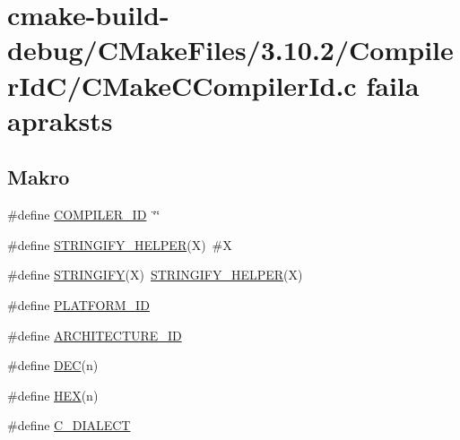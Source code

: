 \hypertarget{cmake-build-debug_2_c_make_files_23_810_82_2_compiler_id_c_2_c_make_c_compiler_id_8c}{}\section{cmake-\/build-\/debug/\+C\+Make\+Files/3.10.2/\+Compiler\+Id\+C/\+C\+Make\+C\+Compiler\+Id.c faila apraksts}
\label{cmake-build-debug_2_c_make_files_23_810_82_2_compiler_id_c_2_c_make_c_compiler_id_8c}
\subsection*{Makro}
\begin{DoxyCompactItemize}
\item 
\#define \hyperlink{cmake-build-debug_2_c_make_files_23_810_82_2_compiler_id_c_2_c_make_c_compiler_id_8c_a81dee0709ded976b2e0319239f72d174}{C\+O\+M\+P\+I\+L\+E\+R\+\_\+\+ID}~\char`\"{}\char`\"{}
\item 
\#define \hyperlink{cmake-build-debug_2_c_make_files_23_810_82_2_compiler_id_c_2_c_make_c_compiler_id_8c_a2ae9b72bb13abaabfcf2ee0ba7d3fa1d}{S\+T\+R\+I\+N\+G\+I\+F\+Y\+\_\+\+H\+E\+L\+P\+ER}(X)~\#X
\item 
\#define \hyperlink{cmake-build-debug_2_c_make_files_23_810_82_2_compiler_id_c_2_c_make_c_compiler_id_8c_a43e1cad902b6477bec893cb6430bd6c8}{S\+T\+R\+I\+N\+G\+I\+FY}(X)~\hyperlink{cmake-build-release_2_c_make_files_23_810_82_2_compiler_id_c_x_x_2_c_make_c_x_x_compiler_id_8cpp_a2ae9b72bb13abaabfcf2ee0ba7d3fa1d}{S\+T\+R\+I\+N\+G\+I\+F\+Y\+\_\+\+H\+E\+L\+P\+ER}(X)
\item 
\#define \hyperlink{cmake-build-debug_2_c_make_files_23_810_82_2_compiler_id_c_2_c_make_c_compiler_id_8c_adbc5372f40838899018fadbc89bd588b}{P\+L\+A\+T\+F\+O\+R\+M\+\_\+\+ID}
\item 
\#define \hyperlink{cmake-build-debug_2_c_make_files_23_810_82_2_compiler_id_c_2_c_make_c_compiler_id_8c_aba35d0d200deaeb06aee95ca297acb28}{A\+R\+C\+H\+I\+T\+E\+C\+T\+U\+R\+E\+\_\+\+ID}
\item 
\#define \hyperlink{cmake-build-debug_2_c_make_files_23_810_82_2_compiler_id_c_2_c_make_c_compiler_id_8c_ad1280362da42492bbc11aa78cbf776ad}{D\+EC}(n)
\item 
\#define \hyperlink{cmake-build-debug_2_c_make_files_23_810_82_2_compiler_id_c_2_c_make_c_compiler_id_8c_a46d5d95daa1bef867bd0179594310ed5}{H\+EX}(n)
\item 
\#define \hyperlink{cmake-build-debug_2_c_make_files_23_810_82_2_compiler_id_c_2_c_make_c_compiler_id_8c_a07f8e5783674099cd7f5110e22a78cdb}{C\+\_\+\+D\+I\+A\+L\+E\+CT}
\end{DoxyCompactItemize}
